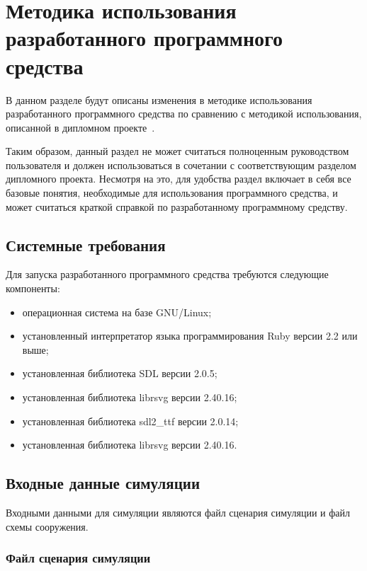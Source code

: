 \section{Методика использования разработанного программного средства}
\label{sec:manual}

В данном разделе будут описаны изменения в методике использования разработанного программного средства по сравнению
с методикой использования, описанной в дипломном проекте~\cite{my_diploma}.

Таким образом, данный раздел не может считаться полноценным руководством пользователя и должен
использоваться в сочетании с соответствующим разделом дипломного проекта.
Несмотря на это, для удобства раздел включает в себя все базовые понятия, необходимые для использования программного средства,
и может считаться краткой справкой по разработанному программному средству.

\subsection{Системные требования}
\label{sec:manual:requirements}

Для запуска разработанного программного средства требуются следующие компоненты:
\begin{itemize}
  \item операционная система на базе GNU/Linux;
  \item установленный интерпретатор языка программирования Ruby версии 2.2 или выше;
  \item установленная библиотека SDL версии 2.0.5;
  \item установленная библиотека librsvg версии 2.40.16;
  \item установленная библиотека sdl2\_ttf версии 2.0.14;
  \item установленная библиотека librsvg версии 2.40.16.
\end{itemize}

\subsection{Входные данные симуляции}
\label{sec:manual:input}

Входными данными для симуляции являются файл сценария симуляции и файл схемы сооружения.

\subsubsection{Файл сценария симуляции}
\label{sec:manual:input:scenario}

